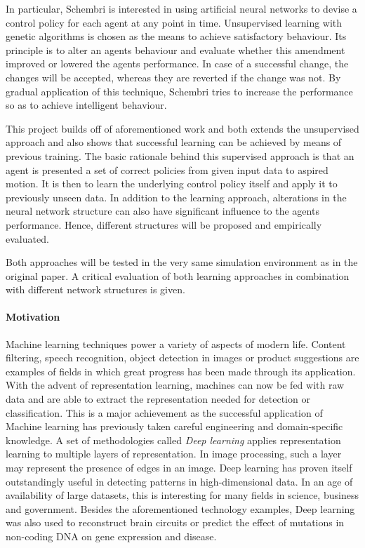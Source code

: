 \documentclass[10pt,a4paper,DIV=11]{scrreprt}
\begin{document}
In particular, Schembri is interested in using artificial neural networks to devise a control policy for each agent at any point in time. 
Unsupervised learning with genetic algorithms is chosen as the means to achieve satisfactory behaviour. Its principle is to alter 
an agents behaviour and evaluate whether this amendment improved or lowered the agents performance. In case of a successful change, the changes
will be accepted, whereas they are reverted if the change was not. By gradual application of this technique, Schembri tries to increase
the performance so as to achieve intelligent behaviour.


This project builds off of aforementioned work and both extends the unsupervised approach and also shows that successful learning can be 
achieved by means of previous training. The basic rationale behind this supervised approach is that an agent is presented a set of correct 
policies from given input data to aspired motion. It is then to learn the underlying control policy itself and apply it to
previously unseen data. In addition to the learning approach, alterations in the neural network structure can also have significant influence
to the agents performance. Hence, different structures will be proposed and empirically evaluated.


Both approaches will be tested in the very same simulation environment as in the original paper. A critical evaluation of both learning approaches
in combination with different network structures is given.

\paragraph{Motivation}
Machine learning techniques power a variety of aspects of modern life. Content filtering, speech recognition, object detection in
images or product suggestions are examples of fields in which great progress has been made through its application. 
With the advent of representation learning, machines can now be fed with raw data and are able to extract the representation needed for detection
or classification. This is a major achievement as the successful application of Machine learning has previously taken careful engineering and
domain-specific knowledge. A set of methodologies called \textit{Deep learning} applies representation learning to multiple layers of representation. 
In image processing, such a layer may represent the presence of edges in an image. Deep learning has proven itself outstandingly useful in detecting 
patterns in high-dimensional data. In an age of availability of large datasets, this is interesting for many fields in science, business and government.
Besides the aforementioned technology examples, Deep learning was also used to reconstruct brain circuits or predict the effect of mutations in
non-coding DNA on gene expression and disease.\cite{DEEPLEARNING}
\end{document}
